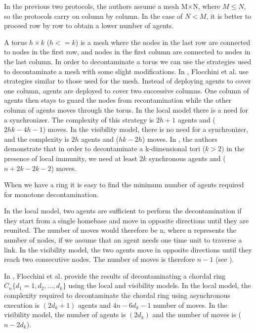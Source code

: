 In the previous two protocols, the authors assume a mesh M×N, where $M\leq N$, so the protocols carry on column by column. In the case of  $N < M$, it is better to proceed row by row to obtain a lower number of agents.

A torus $h\times k$ ($h<=k$) is a mesh where the nodes in the last row are connected to nodes in the first row, and nodes in the first column are connected to nodes in the last column. In order to decontaminate a torus we can use the strategies used to decontaminate a mesh with some slight modifications.  In \cite{floetal17}, Flocchini et al. use strategies similar to those used for the mesh. Instead of deploying agents to cover one column, agents are deployed to cover two successive columns. One column of agents then stays to guard the nodes from recontamination while the other column of agents moves through the torus. In the local model there is a need for a synchronizer. The complexity of this strategy is $2h+1$ agents and ($2hk-4h-1$) moves. In the visibility model, there is no need for a synchronizer, and the complexity is $2h$ agents and ($hk-2h$) moves. In \cite{lucetal22}, the authors demonstrate that in order to decontaminate a  k-dimensional tori ($k>2$) in the presence of local immunity, we need at least $2k$ synchronous agents and ($n+2k-2k-2$) moves.

When we have a ring  it is easy to find the minimum number of agents required for monotone decontamination. 

In the local model, two agents are sufficient to perform the decontamination if they start from a single homebase and move in opposite directions until they are reunited. The number of moves would therefore be n, where n represents the number of nodes, if we assume that an agent needs one time unit to traverse a link. In the visibility model, the two agents move in opposite directions until they reach two consecutive nodes. The number of moves is therefore $n-1$ (see  \cite{lucetal22}).


In \cite{floetal17}, Flocchini et al. provide the results of decontaminating a chordal ring $C_n\{d_1=1,d_2,...,d_k\}$ using the local and visibility models. In the local model, the complexity required to decontaminate the chordal ring using  asynchronous execution is $ (2d_k+1)$ agents and $4n-6d_k-1$ number of moves. In the visibility model, the number of agents is $(2  d_k)$  and the number of moves is ($n-2d_k$). 





